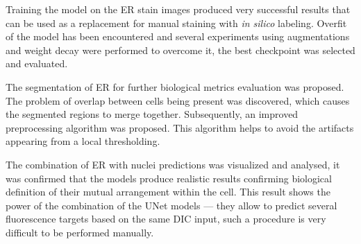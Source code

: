 Training the model on the ER stain images produced very successful results that can be used as a replacement for manual staining with \textit{in silico} labeling. Overfit of the model has been encountered and several experiments using augmentations and weight decay were performed to overcome it, the best checkpoint was selected and evaluated.

The segmentation of ER for further biological metrics evaluation was proposed. The problem of overlap between cells being present was discovered, which causes the segmented regions to merge together. Subsequently, an improved preprocessing algorithm was proposed. This algorithm helps to avoid the artifacts appearing from a local thresholding.

The combination of ER with nuclei predictions was visualized and analysed, it was confirmed that the models produce realistic results confirming biological definition of their mutual arrangement within the cell. This result shows the power of the combination of the UNet models --- they allow to predict several fluorescence targets based on the same DIC input, such a procedure is very difficult to be performed manually. 